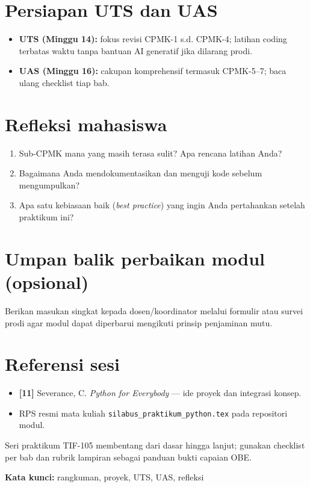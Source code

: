 \documentclass[../main.tex]{subfiles}
\begin{document}
\section{Persiapan UTS dan UAS}

\begin{itemize}[leftmargin=*]
  \item \textbf{UTS (Minggu 14):} fokus revisi CPMK-1 s.d. CPMK-4; latihan coding terbatas waktu tanpa bantuan AI generatif jika dilarang prodi.
  \item \textbf{UAS (Minggu 16):} cakupan komprehensif termasuk CPMK-5--7; baca ulang checklist tiap bab.
\end{itemize}

\section{Refleksi mahasiswa}

\begin{enumerate}[leftmargin=*]
  \item Sub-CPMK mana yang masih terasa sulit? Apa rencana latihan Anda?
  \item Bagaimana Anda mendokumentasikan dan menguji kode sebelum mengumpulkan?
  \item Apa satu kebiasaan baik (\textit{best practice}) yang ingin Anda pertahankan setelah praktikum ini?
\end{enumerate}

\section{Umpan balik perbaikan modul (opsional)}

Berikan masukan singkat kepada dosen/koordinator melalui formulir atau survei prodi agar modul dapat diperbarui mengikuti prinsip penjaminan mutu.

\section{Referensi sesi}

\begin{itemize}[leftmargin=*]
  \item \textbf{[11]} Severance, C. \textit{Python for Everybody} --- ide proyek dan integrasi konsep.
  \item RPS resmi mata kuliah \texttt{silabus\_praktikum\_python.tex} pada repositori modul.
\end{itemize}

\begin{rangkuman}
Seri praktikum TIF-105 membentang dari dasar hingga lanjut; gunakan checklist per bab dan rubrik lampiran sebagai panduan bukti capaian OBE.

\textbf{Kata kunci:} rangkuman, proyek, UTS, UAS, refleksi
\end{rangkuman}
\end{document}
